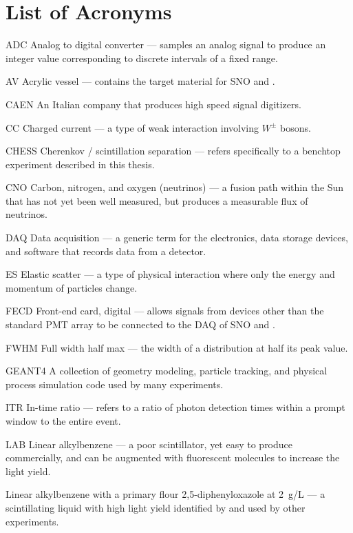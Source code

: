 \chapter*{List of Acronyms}
\begin{labeling}{{\labppo}}
\item[ADC] Analog to digital converter --- samples an analog signal to produce an integer value corresponding to discrete intervals of a fixed range.
\item[AV] Acrylic vessel --- contains the target material for SNO and {\snop}.
\item[CAEN] An Italian company that produces high speed signal digitizers.
\item[CC] Charged current --- a type of weak interaction involving $W^{\pm}$ bosons.
\item[CHESS] Cherenkov / scintillation separation --- refers specifically to a benchtop experiment described in this thesis.
\item[CNO] Carbon, nitrogen, and oxygen (neutrinos) --- a fusion path within the Sun that has not yet been well measured, but produces a measurable flux of neutrinos.
\item[DAQ] Data acquisition --- a generic term for the electronics, data storage devices, and software that records data from a detector.
\item[ES] Elastic scatter --- a type of physical interaction where only the energy and momentum of particles change.
\item[FECD] Front-end card, digital --- allows signals from devices other than the standard PMT array to be connected to the DAQ of SNO and {\snop}.
\item[FWHM] Full width half max --- the width of a distribution at half its peak value.
\item[GEANT4] A collection of geometry modeling, particle tracking, and physical process simulation code used by many experiments.
\item[ITR] In-time ratio --- refers to a ratio of photon detection times within a prompt window to the entire event.
\item[LAB] Linear alkylbenzene --- a poor scintillator, yet easy to produce commercially, and can be augmented with fluorescent molecules to increase the light yield. 
\item[{\labppo}] Linear alkylbenzene with a primary flour 2,5-diphenyloxazole at 2~g/L --- a scintillating liquid with high light yield identified by {\snop} and used by other experiments.

\end{labeling}

